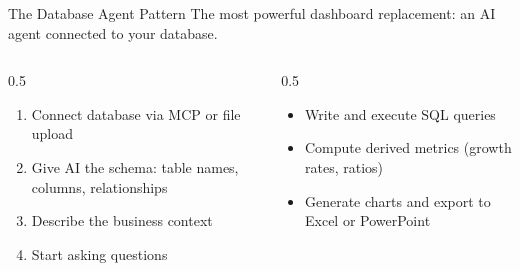 \documentclass[aspectratio=169]{beamer}
\begin{document}
\begin{frame}{The Database Agent Pattern}
The most powerful dashboard replacement: an AI agent connected to your database.
\vspace{0.3cm}
\begin{columns}[T]
\begin{column}{0.5\textwidth}
\begin{shadedbox}[title=\textbf{How to Build It}]
\begin{enumerate}\small
  \item Connect database via MCP or file upload
  \item Give AI the schema: table names, columns, relationships
  \item Describe the business context
  \item Start asking questions
\end{enumerate}
\end{shadedbox}
\end{column}
\begin{column}{0.5\textwidth}
\begin{shadedbox}[title=\textbf{What the Agent Can Do}]
\begin{itemize}\small
  \item Write and execute SQL queries
  \item Compute derived metrics (growth rates, ratios)
  \item Generate charts and export to Excel or PowerPoint
\end{itemize}
\end{shadedbox}
\end{column}
\end{columns}
\end{frame}
\end{document}
